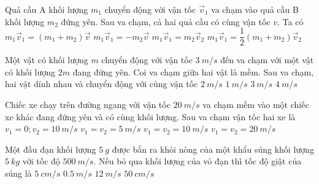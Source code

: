 \begin{ex}
	Quả cầu A khối lượng $m_1$ chuyển động với vận tốc $\vec v_1$ va chạm vào quả cầu B khối lượng $m_2$ đứng yên. Sau va chạm, cả hai quả cầu có cùng vận tốc $v$. Ta có
	\choice
	{\True $m_1\vec v_1=\left(m_1+m_2\right)\vec v$}
	{$m_1\vec v_1=-m_2\vec v$}
	{$m_1\vec v_1=m_2\vec v_2$}
	{$m_1\vec v_1=\dfrac{1}{2}\left(m_1+m_2\right)\vec v_2$}
	\loigiai{}
\end{ex}
\begin{ex}
Một vật có khối lượng $m$ chuyển động với vận tốc $\SI{3}{m/s}$ đến va chạm với một vật có khối lượng  $2m$ đang đứng yên. Coi va chạm giữa hai vật là mềm. Sau va chạm, hai vật dính nhau và chuyển động với cùng vận tốc 	
	\choice
	{$\SI{2}{m/s}$}
	{\True $\SI{1}{m/s}$}
	{$\SI{3}{m/s}$}
	{$\SI{4}{m/s}$}
\end{ex}
\begin{ex}
Chiếc xe chạy trên đường ngang với vận tốc $\SI{20}{m/s}$ va chạm mềm vào một chiếc xe khác đang đứng yên và có cùng khối lượng. Sau va chạm vận tốc hai xe là
	\choice
	{$v_1 = 0; v_2 = \SI{10}{m/s}$}
	{$v_1 = v_2 = \SI{5}{m/s}$}
	{\True $v_1 = v_2 = \SI{10}{m/s}$}
	{$v_1 = v_2 = \SI{20}{m/s}$}
\end{ex}
\begin{ex}
	Một đầu đạn khối lượng $\SI{5}{g}$ được bắn ra khỏi nòng của một khẩu súng khối lượng $\SI{5}{kg}$ với tốc độ $\SI{500}{m/s}$. Nếu bỏ qua khối lượng của vỏ đạn thì tốc độ giật của súng là
	\choice
	{$\SI{5}{cm/s}$}
	{\True $\SI{0,5}{m/s}$}
	{$\SI{12}{m/s}$}
	{$\SI{50}{cm/s}$}
\end{ex}
